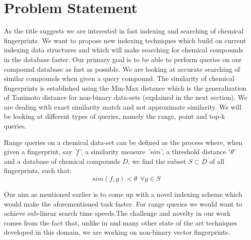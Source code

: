 
\section{Problem Statement}

As the title suggests we are interested in fast indexing and searching of chemical fingerprints. We want to propose new indexing techniques which build on current indexing data structures and which will make searching for chemical compounds in the database faster. Our primary goal is to be able to perform queries on our compound database as fast as possible.
We are looking at accurate searching of similar compounds when given a query compound. The similarity of chemical fingerprints is established using the Min-Max distance which is the generalization of Tanimoto distance for non-binary data-sets (explained in the next section). We are dealing with exact similarity match and not approximate similarity. We will be looking at different types of queries, namely the range, point and top-k queries.\\

\begin{problem}{
Range queries on a chemical data-set can be defined as the process where, when given a fingerprint, say \textit{'f'}, a similarity measure \textit{'sim'}, a threshold distance \textbf{$'\theta'$} and a database of chemical compounds $D$, we find the subset $S \subset D$ of all fingerprints, such that: \\
\begin{equation}
sim(f,g) < \theta ~~ \forall  \textbf{$g\in S$}
\end{equation}
}
\end{problem}
 
%

Our aim as mentioned earlier is to come up with a novel indexing scheme which would make the aforementioned task faster. For range queries we would want to achieve sub-linear search time speeds.The challenge and novelty in our work comes from the fact that, unlike in  \citet*{swamidass2007bounds} and many other state of the art techniques developed in this domain, we are working on non-binary vector fingerprints. \\


